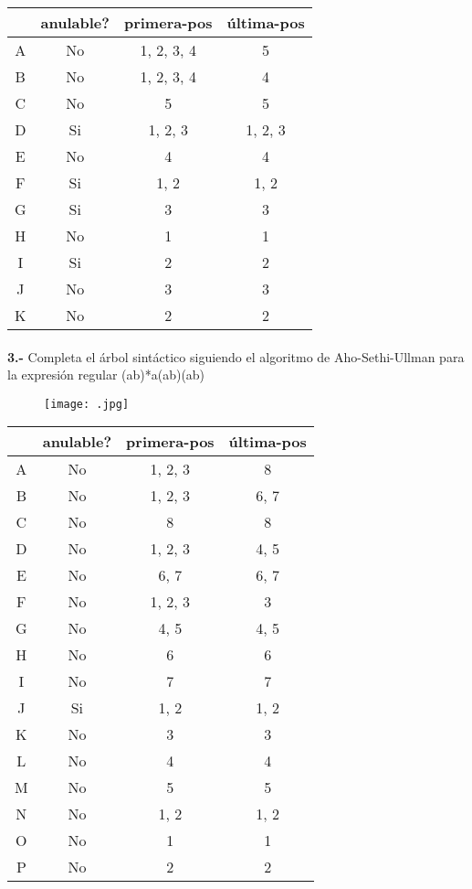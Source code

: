 \documentclass[11pt,a4paper]{report}
\begin{document}
\begin{tabular} {| c | c | c | c |}\hline
 & anulable? & primera-pos & última-pos\\ \hline
A & No & 1, 2, 3, 4 & 5\\ \hline
B & No & 1, 2, 3, 4 & 4\\ \hline
C & No & 5 & 5\\ \hline
D & Si & 1, 2, 3 & 1, 2, 3\\ \hline
E & No & 4 & 4\\ \hline
F & Si & 1, 2 & 1, 2\\ \hline
G & Si & 3 & 3\\ \hline
H & No & 1 & 1\\ \hline
I & Si & 2 & 2\\ \hline
J & No & 3 & 3\\ \hline
K & No & 2 & 2\\ \hline
\end{tabular}\paragraph{}
\textbf{3.-} Completa el árbol sintáctico siguiendo el algoritmo de Aho-Sethi-Ullman para la expresión regular (a\textbar b)*a(a\textbar b)(a\textbar b)
\begin{figure}[ht!]
\centering
\texttt{[image: .jpg]}
\end{figure}

\begin{tabular} {| c | c | c | c |}\hline
 & anulable? & primera-pos & última-pos\\ \hline
A & No & 1, 2, 3 & 8\\ \hline
B & No & 1, 2, 3 & 6, 7\\ \hline
C & No & 8 & 8\\ \hline
D & No & 1, 2, 3 & 4, 5\\ \hline
E & No & 6, 7 & 6, 7\\ \hline
F & No & 1, 2, 3 & 3\\ \hline
G & No & 4, 5 & 4, 5\\ \hline
H & No & 6 & 6\\ \hline
I & No & 7 & 7\\ \hline
J & Si & 1, 2 & 1, 2\\ \hline
K & No & 3 & 3\\ \hline
L & No & 4 & 4\\ \hline
M & No & 5 & 5\\ \hline
N & No & 1, 2 & 1, 2\\ \hline
O & No & 1 & 1\\ \hline
P & No & 2 & 2\\ \hline
\end{tabular}
\end{document}
